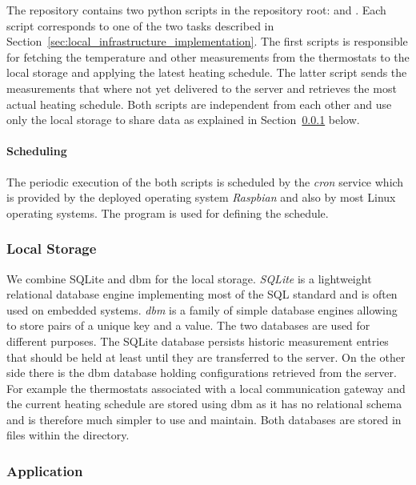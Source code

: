 The  repository contains two python scripts in the repository root:  and .
Each script corresponds to one of the two tasks described in Section~\ref{sec:local_infrastructure_implementation}.
The first scripts is responsible for fetching the temperature and other measurements from the thermostats to the local storage and applying the latest heating schedule.
The latter script sends the measurements that where not yet delivered to the server and retrieves the most actual heating schedule. Both scripts are independent from each other and use only the local storage to share data as explained in Section~\ref{sec:local_infrastructure_implementation_storage} below.

\paragraph{Scheduling}

The periodic execution of the both scripts is scheduled by the \emph{cron} service which is provided by the deployed operating system \emph{Raspbian} and also by most Linux operating systems.
The  program is used for defining the schedule.

\subsubsection{Local Storage}
\label{sec:local_infrastructure_implementation_storage}

We combine SQLite and dbm for the local storage.
\emph{SQLite} is a lightweight relational database engine implementing most of the SQL standard and is often used on embedded systems.
\emph{dbm} is a family of simple database engines allowing to store pairs of a unique key and a value.
The two databases are used for different purposes.
The SQLite database persists historic measurement entries that should be held at least until they are transferred to the server.
On the other side there is the dbm database holding configurations retrieved from the server.
For example the thermostats associated with a local communication gateway and the current heating schedule are stored using dbm as it has no relational schema and is therefore much simpler to use and maintain.
Both databases are stored in files within the  directory.

\subsubsection{Application}

